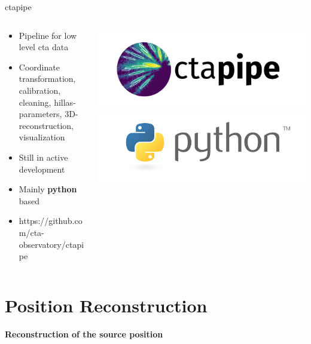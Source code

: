 \documentclass[aspectratio=1610, 9pt]{beamer}
\begin{document}
\begin{frame}{ctapipe}
    \begin{columns}[T] %
        \begin{column}{.45\textwidth}
            \vspace{10pt}
            \begin{itemize}
                \item { Pipeline for low level cta data}
                \item { Coordinate transformation, calibration, cleaning, 
                        hillas-parameters, 3D-reconstruction, visualization}
                \item { Still in active development} 
                \item { Mainly \textbf{python} based}
                \item { https://github.com/cta-observatory/ctapipe}
            \end{itemize}
        \end{column}
        \begin{column}{.48\textwidth}
            \includegraphics[width=\linewidth]{images/ctapipe_logo.png}
            \includegraphics[width=\linewidth]{images/python_logo.png}
        \end{column}
    \end{columns}
\end{frame}




\section{Position Reconstruction}
\begin{frame}
  \centering
  {\Huge \textbf{Reconstruction of the source position}}
\end{frame}
\end{document}
